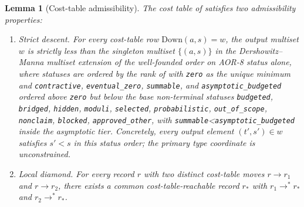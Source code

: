 \documentclass[11pt]{article}
\newtheorem{lemma}[theorem]{Lemma}
\theoremstyle{definition}
\begin{document}
\begin{lemma}[Cost-table admissibility]\label{lem:aor:cost-table-admissibility}
The cost table of  satisfies two admissibility
properties:
\begin{enumerate}
  \item \emph{Strict descent.}  For every cost-table row
  \(\mathrm{Down}(a,s)=w\), the output multiset \(w\) is strictly less
  than the singleton multiset \(\{(a,s)\}\) in the Dershowitz--Manna
  multiset extension \citep{DershowitzManna1979Multiset} of the
  well-founded order on AOR-8 status alone, where statuses are ordered by
  the rank of  with \texttt{zero} as the unique
  minimum and \texttt{contractive}, \texttt{eventual\_zero},
  \texttt{summable}, and \texttt{asymptotic\_budgeted} ordered above
  \texttt{zero} but below the base non-terminal statuses \texttt{budgeted},
  \texttt{bridged}, \texttt{hidden}, \texttt{moduli}, \texttt{selected},
  \texttt{probabilistic}, \texttt{out\_of\_scope}, \texttt{nonclaim},
  \texttt{blocked}, \texttt{approved\_other}, with
  \texttt{summable}<\texttt{asymptotic\_budgeted} inside the asymptotic
  tier.  Concretely, every output element \((t',s')\in w\) satisfies
  \(s'<s\) in this status order; the primary type coordinate is
  unconstrained.
  \item \emph{Local diamond.}  For every record \(r\) with two distinct
  cost-table moves \(r\to r_1\) and \(r\to r_2\), there exists a common
  cost-table-reachable record \(r_*\) with \(r_1\to^* r_*\) and
  \(r_2\to^* r_*\).
\end{enumerate}
\end{lemma}
\end{document}
